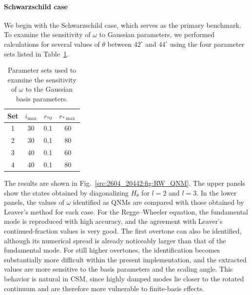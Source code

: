 \paragraph{Schwarzschild case}
We begin with the Schwarzschild case, which serves as the primary benchmark.
To examine the sensitivity of $\omega$ to Gaussian parameters, we performed calculations for several values of $\theta$ between $42^\circ$ and $44^\circ$ using the four parameter sets listed in Table~\ref{src:2604_20442:tab:RW_parameters}.
\begin{table}[htbp]
  \centering
  \caption{Parameter sets used to examine the sensitivity of $\omega$ to the Gaussian basis parameters.}
  \label{src:2604_20442:tab:RW_parameters}
  \begin{tabular}{cccc}
    \toprule
    Set & $i_{\max}$ & $r_{*0}$ & $r_{*\max}$ \\
    \midrule
    1 & 30 & 0.1 & 60 \\
    2 & 30 & 0.1 & 80 \\
    3 & 40 & 0.1 & 60 \\
    4 & 40 & 0.1 & 80 \\
    \bottomrule
  \end{tabular}
\end{table}
The results are shown in Fig.~\ref{src:2604_20442:fig:RW_QNM}.
The upper panels show the states obtained by diagonalizing $H_\theta$ for $l=2$ and $l=3$. In the lower panels, the values of $\omega$ identified as QNMs are compared with those obtained by Leaver’s method for each case.
For the Regge--Wheeler equation, the fundamental mode is reproduced with high accuracy, and the agreement with Leaver's continued-fraction values is very good.
The first overtone can also be identified, although its numerical spread is already noticeably larger than that of the fundamental mode.
For still higher overtones, the identification becomes substantially more difficult within the present implementation, and the extracted values are more sensitive to the basis parameters and the scaling angle.
This behavior is natural in CSM, since highly damped modes lie closer to the rotated continuum and are therefore more vulnerable to finite-basis effects.
